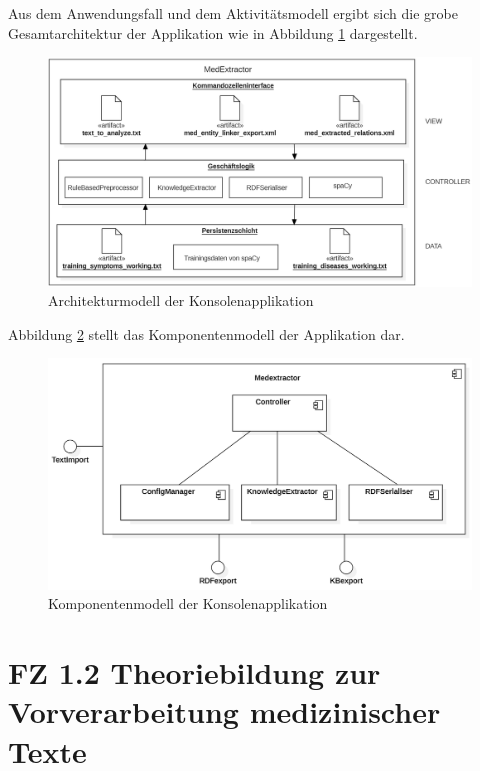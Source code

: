 Aus dem Anwendungsfall und dem Aktivitätsmodell ergibt sich die grobe Gesamtarchitektur der Applikation wie in Abbildung \ref{fig:architekturmodell} dargestellt.

\begin{figure}[h]
    \centering
    \includegraphics[width=\textwidth]{pictures/Architekturmodell.png}
    \caption{Architekturmodell der Konsolenapplikation}
    \label{fig:architekturmodell}
\end{figure}

Abbildung \ref{fig:komponentendiagramm} stellt das Komponentenmodell der Applikation dar.

\begin{figure}[h]
    \centering
    \includegraphics[width=\textwidth]{pictures/ComponentDiagram.png}
    \caption{Komponentenmodell der Konsolenapplikation}
    \label{fig:komponentendiagramm}
\end{figure}


\section{FZ 1.2 Theoriebildung zur Vorverarbeitung medizinischer Texte}
\label{sec:FZ1.2} 

